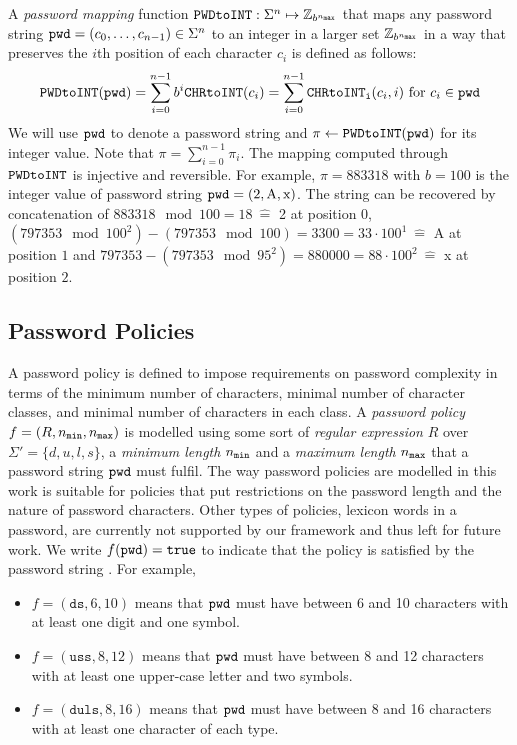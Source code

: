 A \emph{password mapping} function $\texttt{PWDtoINT}:\Sigma^n\mapsto\mathbb{Z}_{b^{{n_\mathtt{max}}}}$ that maps any password string $\mathtt{pwd}=(c_{0},\dots,c_{n-1})\in\Sigma^n$ to an integer in a larger set $\mathbb{Z}_{b^{{n_\mathtt{max}}}}$ in a way that preserves the $i$th position of each character $c_i$ is defined as follows:
\[
\texttt{PWDtoINT}(\mathtt{pwd}) = \sum_{i=0}^{n-1}b^{i} \texttt{CHRtoINT}(c_{i}) = \sum_{i=0}^{n-1}\texttt{CHRtoINT}_\texttt{i}(c_i, i) \textrm{ for } c_i\in\mathtt{pwd}
\]
We will use $\mathtt{pwd}$ to denote a password string and $\pi \gets \texttt{PWDtoINT}(\mathtt{pwd})$ for its integer value. Note that $\pi = \sum_{i=0}^{n-1}\pi_i$. %
The mapping computed through $\texttt{PWDtoINT}$ is injective and reversible. For example, $\pi = 883318$ with $b=100$ is the integer value of password string $\mathtt{pwd} = (\textrm{2},\textrm{A},\textrm{x})$. The string can be recovered by concatenation of $883318\mod 100=18~ \widehat{=}$ 2 at position 0, $(797353\mod 100^2)-(797353\mod 100)=3300=33\cdot 100^1~ \widehat{=}$ A at position $1$ and $797353-(797353\mod95^2)=880000=88\cdot 100^2~ \widehat{=}$ x at position $2$.



\subsection{Password Policies}\label{sec:policies}
A password policy is defined to impose requirements on password complexity in terms of the minimum number of characters, minimal number of character classes, and minimal number of characters in each class.
A \emph{password policy} $f=(R,{n_\mathtt{min}},{n_\mathtt{max}})$ is modelled using some sort of \emph{regular expression} $R$ over $\Sigma'=\{d, u, l, s\}$, a \emph{minimum length} ${n_\mathtt{min}}$ and a \emph{maximum length} ${n_\mathtt{max}}$ that a password string $\mathtt{pwd}$ must fulfil.
The way password policies are modelled in this work is suitable for policies that put restrictions on the password length and the nature of password characters. Other types of policies, \eg lexicon words in a password, are currently not supported by our framework and thus left for future work.
We write $f(\mathtt{pwd})=\mathtt{true}$ to indicate that the policy is satisfied by the password string \pwd.
For example, %
\begin{itemize}
	\item $f=(\mathtt{ds}, 6, 10)$ means that $\mathtt{pwd}$ must have between 6 and 10 characters with at least one digit and one symbol.
	\item $f=(\mathtt{uss}, 8, 12)$ means that $\mathtt{pwd}$ must have between 8 and 12 characters with at least one upper-case letter and two symbols.
	\item $f=(\mathtt{duls}, 8, 16)$ means that $\mathtt{pwd}$ must have between 8 and 16 characters with at least one character of each type.
\end{itemize}

